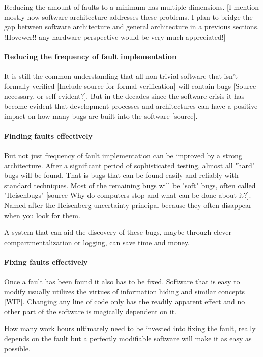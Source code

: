 Reducing the amount of faults to a minimum has multiple dimensions. 
[I mention mostly how software architecture addresses these problems. I plan to bridge the gap between software architecture and general architecture in a previous sections. !Hovewer!! any hardware perspective would be very much appreciated!]
\paragraph{Reducing the frequency of fault implementation}
It is still the common understanding that all non-trivial software that isn't formally verified [Include source for formal verification] will contain bugs [Source necessary, or self-evident?]. But in the decades since the software crisis it has become evident that development processes and architectures can have a positive impact on how many bugs are built into the software [source].  
\paragraph{Finding faults effectively}
But not just frequency of fault implementation can be improved by a strong architecture. After a significant period of sophisticated testing, almost all "hard" bugs will be found. That is bugs that can be found easily and reliably
with standard techniques. Most of the remaining bugs will be "soft" bugs, often called "Heisenbugs" [source Why do computers stop and what can be done about it?]. Named after the Heisenberg uncertainty principal because they often disappear when you look for them. 

A system that can aid the discovery of these bugs, maybe through clever compartmentalization or logging, can save time and money.
\paragraph{Fixing faults effectively}
Once a fault has been found it also has to be fixed. Software that is easy to modify usually utilizes the virtues of information hiding and similar  concepts [WIP]. Changing any line of code only has the readily apparent effect and no other part of the software is magically dependent on it.

How many work hours ultimately need to be invested into fixing the fault, really depends on the fault but a perfectly modifiable software will make it as easy as possible.
